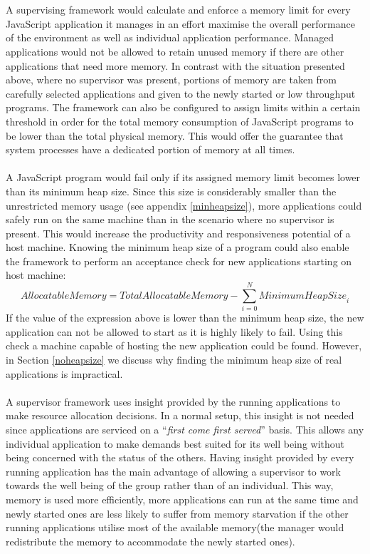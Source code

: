 \documentclass{l4proj}
\begin{document}
\\\\
\hspace*{3em} A supervising framework would calculate and enforce a memory limit for every JavaScript application it manages in an effort maximise the overall performance of the environment as well as individual application performance. Managed applications would not be allowed to retain unused memory if there are other applications that need more memory. In contrast with the situation presented above, where no supervisor was present, portions of memory are taken from carefully selected applications and given to the newly started or low throughput programs. The framework can also be configured to assign limits within a certain threshold in order for the total memory consumption of JavaScript programs to be lower than the total physical memory. This would offer the guarantee that system processes have a dedicated portion of memory at all times.
\\\\
\hspace*{3em} A JavaScript program would fail only if its assigned memory limit becomes lower than its minimum heap size. Since this size is considerably smaller than the unrestricted memory usage (see appendix \cref{minheapsize}), more applications could safely run on the same machine than in the scenario where no supervisor is present. This would increase the productivity and responsiveness potential of a host machine. Knowing the minimum heap size of a program could also enable the framework to perform an acceptance check for new applications starting on host machine:
\begin{equation} 
\textit{AllocatableMemory} = \textit{TotalAllocatableMemory} - \sum_{i=0}^{N}\textit{MinimumHeapSize}_i
\end{equation}
If the value of the expression above is lower than the minimum heap size, the new application can not be allowed to start as it is highly likely to fail. Using this check a machine capable of hosting the new application could be found. However, in Section \ref{noheapsize} we discuss why finding the minimum heap size of real applications is impractical. 
\\\\
\hspace*{3em} A supervisor framework uses insight provided by the running applications to make resource allocation decisions. In a normal setup, this insight is not needed since applications are serviced on a ``\textit{first come first served}'' basis. This allows any individual application to make demands best suited for its well being without being concerned with the status of the others. Having insight provided by every running application has the main advantage of allowing a supervisor to work towards the well being of the group rather than of an individual. This way, memory is used more efficiently, more applications can run at the same time and newly started ones are less likely to suffer from memory starvation if the other running applications utilise most of the available memory(the manager would redistribute the memory to accommodate the newly started ones).
\end{document}
